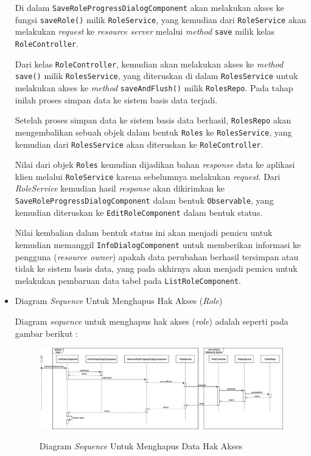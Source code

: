 \documentclass[pdftex,12pt, oneside]{article}
\begin{document}
\begin{itemize}
	Di dalam \texttt{SaveRoleProgressDialogComponent} akan melakukan akses ke fungsi \texttt{saveRole()} milik \texttt{RoleService}, yang kemudian dari \texttt{RoleService} akan melakukan \textit{request} ke \textit{resource server} melalui \textit{method} \texttt{save} milik kelas \texttt{RoleController}.
	
	Dari kelas \texttt{RoleController}, kemudian akan melakukan akses ke \textit{method} \texttt{save()} milik \texttt{RolesService}, yang diteruskan di dalam \texttt{RolesService} untuk melakukan akses ke \textit{method} \texttt{saveAndFlush()} milik \texttt{RolesRepo}. Pada tahap inilah proses simpan data ke sistem basis data terjadi.
	
	Setelah proses simpan data ke sistem basis data berhasil, \texttt{RolesRepo} akan mengembalikan sebuah objek dalam bentuk \texttt{Roles} ke \texttt{RolesService}, yang kemudian dari \texttt{RolesService} akan diteruskan ke \texttt{RoleController}.
	
	Nilai dari objek \texttt{Roles} kemudian dijadikan bahan \textit{response} data ke aplikasi klien melalui \texttt{RoleService} karena sebelumnya melakukan \textit{request}. Dari \textit{RoleService} kemudian hasil \textit{response} akan dikirimkan ke \texttt{SaveRoleProgressDialogComponent} dalam bentuk \texttt{Observable}, yang kemudian diteruskan ke \texttt{EditRoleComponent} dalam bentuk status.
	
	Nilai kembalian dalam bentuk status ini akan menjadi pemicu untuk kemudian memanggil \texttt{InfoDialogComponent} untuk memberikan informasi ke pengguna (\textit{resource owner}) apakah data perubahan berhasil tersimpan atau tidak ke sistem basis data, yang pada akhirnya akan menjadi pemicu untuk melakukan pembaruan data tabel pada \texttt{ListRoleComponent}.
	
	\item Diagram \textit{Sequence} Untuk Menghapus Hak Akses (\textit{Role})
	
	Diagram \textit{sequence} untuk menghapus hak akses (\textit{role}) adalah seperti pada gambar berikut :
	
	\begin{figure}[H]
		\centering
		\includegraphics[width=1\textwidth]{./resources/seq-del-role}
		\label{fig:seq-del-role}
		\caption{Diagram \textit{Sequence} Untuk Menghapus Data Hak Akses}
	\end{figure}
	

\end{itemize}
\end{document}
